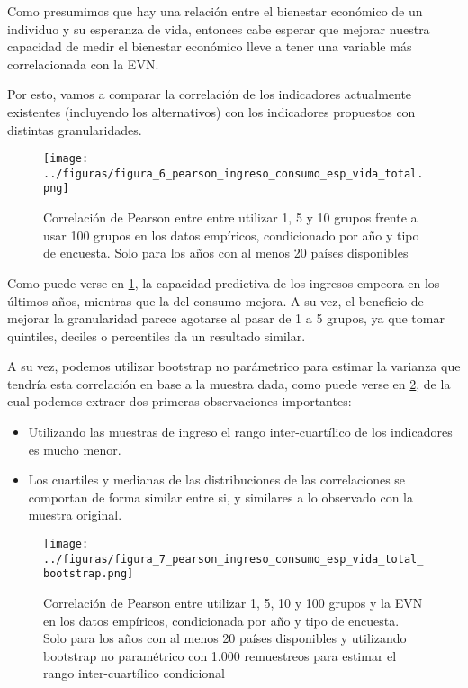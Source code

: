 Como presumimos que hay una relación entre el bienestar económico de un individuo y su esperanza de vida, entonces cabe esperar que mejorar nuestra capacidad de medir el bienestar económico lleve a tener una variable más correlacionada con la EVN.

Por esto, vamos a comparar la correlación de los indicadores actualmente existentes (incluyendo los alternativos) con los indicadores propuestos con distintas granularidades.


\begin{figure}[H] %
    \centering %
    \texttt{[image: ../figuras/figura\_6\_pearson\_ingreso\_consumo\_esp\_vida\_total.png]} %
    \caption{Correlación de Pearson entre entre utilizar 1, 5 y 10 grupos frente a usar 100 grupos en los datos empíricos, condicionado por año y tipo de encuesta. Solo para los años con al menos 20 países disponibles}
    \label{fig:6} %
\end{figure}

Como puede verse en \ref{fig:6}, la capacidad predictiva de los ingresos empeora en los últimos años, mientras que la del consumo mejora. A su vez, el beneficio de mejorar la granularidad parece agotarse al pasar de 1 a 5 grupos, ya que tomar quintiles, deciles o percentiles da un resultado similar.

A su vez, podemos utilizar bootstrap no parámetrico para estimar la varianza que tendría esta correlación en base a la muestra dada, como puede verse en \ref{fig:7}, de la cual podemos extraer dos primeras observaciones importantes:

\begin{itemize}
    \item Utilizando las muestras de ingreso el rango inter-cuartílico de los indicadores es mucho menor.
    \item Los cuartiles y medianas de las distribuciones de las correlaciones se comportan de forma similar entre si, y similares a lo observado con la muestra original.
\end{itemize}

\begin{figure}[H] %
    \centering %
    \texttt{[image: ../figuras/figura\_7\_pearson\_ingreso\_consumo\_esp\_vida\_total\_bootstrap.png]} %
    \caption{Correlación de Pearson entre utilizar 1, 5, 10 y 100 grupos y la EVN en los datos empíricos, condicionada por año y tipo de encuesta. Solo para los años con al menos 20 países disponibles y utilizando bootstrap no paramétrico con 1.000 remuestreos para estimar el rango inter-cuartílico condicional}
    \label{fig:7} %
\end{figure}

